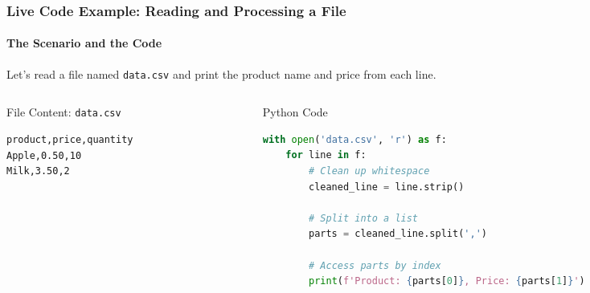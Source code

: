 \documentclass{beamer}
\begin{document}
\begin{frame}[fragile]
    \frametitle{Live Code Example: Reading and Processing a File}
    \framesubtitle{The Scenario and the Code}
    
    Let's read a file named \texttt{data.csv} and print the product name and price from each line.
    
    \begin{columns}[T] %
        \begin{column}{0.4\textwidth}
            \begin{block}{File Content: \texttt{data.csv}}
\begin{lstlisting}
product,price,quantity
Apple,0.50,10
Milk,3.50,2
\end{lstlisting}
            \end{block}
        \end{column}
        
        \begin{column}{0.6\textwidth}
            \begin{block}{Python Code}
\begin{lstlisting}[language=Python]
with open('data.csv', 'r') as f:
    for line in f:
        # Clean up whitespace
        cleaned_line = line.strip()
        
        # Split into a list
        parts = cleaned_line.split(',')
        
        # Access parts by index
        print(f'Product: {parts[0]}, Price: {parts[1]}')
\end{lstlisting}
            \end{block}
        \end{column}
    \end{columns}
\end{frame}
\end{document}
